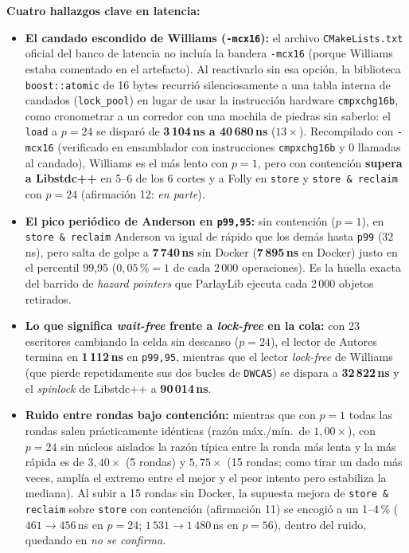 \documentclass[11pt,a4paper]{article}
\begin{document}
\textbf{Cuatro hallazgos clave en latencia:}
\begin{itemize}
  \item \textbf{El candado escondido de Williams (\texttt{-mcx16}):} el archivo \texttt{CMakeLists.txt} oficial del banco de latencia no incluía la bandera \texttt{-mcx16} (porque Williams estaba comentado en el artefacto). Al reactivarlo sin esa opción, la biblioteca \texttt{boost::\allowbreak atomic} de 16 bytes recurrió silenciosamente a una tabla interna de candados (\texttt{lock\_\allowbreak pool}) en lugar de usar la instrucción hardware \texttt{cmpxchg16b}, como cronometrar a un corredor con una mochila de piedras sin saberlo: el \texttt{load} a $p=24$ se disparó de \textbf{3\,104\,ns a 40\,680\,ns} ($13\times$). Recompilado con \texttt{-mcx16} (verificado en ensamblador con instrucciones \texttt{cmpxchg16b} y 0 llamadas al candado), Williams es el más lento con $p=1$, pero con contención \textbf{supera a Libstdc++} en 5--6 de los 6 cortes y a Folly en \texttt{store} y \texttt{store \& reclaim} con $p=24$ (afirmación 12: \emph{en parte}).
  \item \textbf{El pico periódico de Anderson en \texttt{p99,95}:} sin contención ($p=1$), en \texttt{store \& reclaim} Anderson va igual de rápido que los demás hasta \texttt{p99} (32\,ns), pero salta de golpe a \textbf{7\,740\,ns} sin Docker (\textbf{7\,895\,ns} en Docker) justo en el percentil 99,95 ($0,05\,\% = 1 \text{ de cada } 2\,000$ operaciones). Es la huella exacta del barrido de \emph{hazard pointers} que ParlayLib ejecuta cada 2\,000 objetos retirados.
  \item \textbf{Lo que significa \emph{wait-free} frente a \emph{lock-free} en la cola:} con 23 escritores cambiando la celda sin descanso ($p=24$), el lector de Autores termina en \textbf{1\,112\,ns} en \texttt{p99,95}, mientras que el lector \emph{lock-free} de Williams (que pierde repetidamente sus dos bucles de \texttt{DWCAS}) se dispara a \textbf{32\,822\,ns} y el \emph{spinlock} de Libstdc++ a \textbf{90\,014\,ns}.
  \item \textbf{Ruido entre rondas bajo contención:} mientras que con $p=1$ todas las rondas salen prácticamente idénticas (razón máx./mín.\ de $1,00\times$), con $p=24$ sin núcleos aislados la razón típica entre la ronda más lenta y la más rápida es de $3,40\times$ (5 rondas) y $5,75\times$ (15 rondas; como tirar un dado más veces, amplía el extremo entre el mejor y el peor intento pero estabiliza la mediana). Al subir a 15 rondas sin Docker, la supuesta mejora de \texttt{store \& reclaim} sobre \texttt{store} con contención (afirmación 11) se encogió a un 1--4\,\% ($461 \to 456$\,ns en $p=24$; $1\,531 \to 1\,480$\,ns en $p=56$), dentro del ruido, quedando en \emph{no se confirma}.
\end{itemize}
\end{document}
